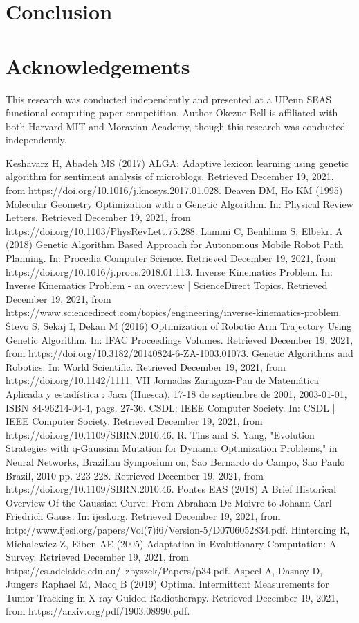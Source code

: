 \documentclass{JMLFS}
\begin{document}
\section{Conclusion}


\section*{Acknowledgements}
This research was conducted independently and presented at a UPenn SEAS functional computing paper competition. Author Okezue Bell is affiliated with both Harvard-MIT and Moravian Academy, though this research was conducted independently.



\begin{thebibliography}{99}
 Keshavarz H, Abadeh MS (2017) ALGA: Adaptive lexicon learning using genetic algorithm for sentiment analysis of microblogs. Retrieved December 19, 2021, from https://doi.org/10.1016/j.knosys.2017.01.028.
 Deaven DM, Ho KM (1995) Molecular Geometry Optimization with a Genetic Algorithm. In: Physical Review Letters.  Retrieved December 19, 2021, from https://doi.org/10.1103/PhysRevLett.75.288.
 Lamini C, Benhlima S, Elbekri A (2018) Genetic Algorithm Based Approach for Autonomous Mobile Robot Path Planning. In: Procedia Computer Science. Retrieved December 19, 2021, from https://doi.org/10.1016/j.procs.2018.01.113.
 Inverse Kinematics Problem. In: Inverse Kinematics Problem - an overview | ScienceDirect Topics. Retrieved December 19, 2021, from https://www.sciencedirect.com/topics/engineering/inverse-kinematics-problem. 
 Števo S, Sekaj I, Dekan M (2016) Optimization of Robotic Arm Trajectory Using Genetic Algorithm. In: IFAC Proceedings Volumes. Retrieved December 19, 2021, from https://doi.org/10.3182/20140824-6-ZA-1003.01073.
 Genetic Algorithms and Robotics. In: World Scientific. Retrieved December 19, 2021, from https://doi.org/10.1142/1111.
 VII Jornadas Zaragoza-Pau de Matemática Aplicada y estadística : Jaca (Huesca), 17-18 de septiembre de 2001, 2003-01-01, ISBN 84-96214-04-4, pags. 27-36.
 CSDL: IEEE Computer Society. In: CSDL | IEEE Computer Society.  Retrieved December 19, 2021, from https://doi.org/10.1109/SBRN.2010.46.
 R. Tins and S. Yang, "Evolution Strategies with q-Gaussian Mutation for Dynamic Optimization Problems," in Neural Networks, Brazilian Symposium on, Sao Bernardo do Campo, Sao Paulo Brazil, 2010 pp. 223-228. Retrieved December 19, 2021, from https://doi.org/10.1109/SBRN.2010.46.
 Pontes EAS (2018) A Brief Historical Overview Of the Gaussian Curve: From Abraham De Moivre to Johann Carl Friedrich Gauss. In: ijesl.org. Retrieved December 19, 2021, from http://www.ijesi.org/papers/Vol(7)i6/Version-5/D0706052834.pdf.
 Hinterding R, Michalewicz Z, Eiben AE (2005) Adaptation in Evolutionary Computation: A Survey. Retrieved December 19, 2021, from https://cs.adelaide.edu.au/~zbyszek/Papers/p34.pdf.
 Aspeel A, Dasnoy D, Jungers Raphael M, Macq B (2019) Optimal Intermittent Measurements for Tumor Tracking in X-ray Guided Radiotherapy. Retrieved December 19, 2021, from  https://arxiv.org/pdf/1903.08990.pdf.
\end{thebibliography}
\end{document}
